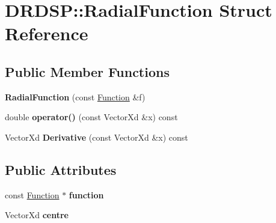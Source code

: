 \hypertarget{struct_d_r_d_s_p_1_1_radial_function}{\section{D\-R\-D\-S\-P\-:\-:Radial\-Function Struct Reference}
\label{struct_d_r_d_s_p_1_1_radial_function}
}
\subsection*{Public Member Functions}
\begin{DoxyCompactItemize}
\item 
\hypertarget{struct_d_r_d_s_p_1_1_radial_function_af76c1242733062aa4e8c9d678c184699}{{\bfseries Radial\-Function} (const \hyperlink{struct_d_r_d_s_p_1_1_function}{Function} \&f)}\label{struct_d_r_d_s_p_1_1_radial_function_af76c1242733062aa4e8c9d678c184699}

\item 
\hypertarget{struct_d_r_d_s_p_1_1_radial_function_ac910711325cf75fd03c5f6d606a1998d}{double {\bfseries operator()} (const Vector\-Xd \&x) const }\label{struct_d_r_d_s_p_1_1_radial_function_ac910711325cf75fd03c5f6d606a1998d}

\item 
\hypertarget{struct_d_r_d_s_p_1_1_radial_function_a3591cc597921ae48dc823c65536e90fb}{Vector\-Xd {\bfseries Derivative} (const Vector\-Xd \&x) const }\label{struct_d_r_d_s_p_1_1_radial_function_a3591cc597921ae48dc823c65536e90fb}

\end{DoxyCompactItemize}
\subsection*{Public Attributes}
\begin{DoxyCompactItemize}
\item 
\hypertarget{struct_d_r_d_s_p_1_1_radial_function_ab3187b18b805dbc39704916d1a57697f}{const \hyperlink{struct_d_r_d_s_p_1_1_function}{Function} $\ast$ {\bfseries function}}\label{struct_d_r_d_s_p_1_1_radial_function_ab3187b18b805dbc39704916d1a57697f}

\item 
\hypertarget{struct_d_r_d_s_p_1_1_radial_function_ae854a39065305d4ca7dd614ca914c3a1}{Vector\-Xd {\bfseries centre}}\label{struct_d_r_d_s_p_1_1_radial_function_ae854a39065305d4ca7dd614ca914c3a1}

\end{DoxyCompactItemize}
